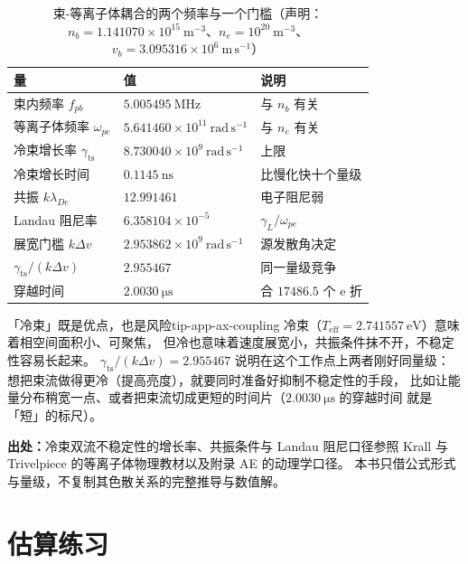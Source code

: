 \begin{table}[htbp]
\centering
\small
\caption{束-等离子体耦合的两个频率与一个门槛（声明：$n_b=1.141070\times10^{15}\ \mathrm{m^{-3}}$、$n_e=10^{20}\ \mathrm{m^{-3}}$、$v_b=3.095316\times10^{6}\ \mathrm{m\,s^{-1}}$）}
\label{tab:app-ax-coupling}
\begin{tabular}{p{5.0cm}p{4.4cm}p{4.0cm}}
\hline
量 & 值 & 说明 \\
\hline
束内频率 $f_{pb}$ & $5.005495\ \mathrm{MHz}$ & 与 $n_b$ 有关 \\
等离子体频率 $\omega_{pe}$ & $5.641460\times10^{11}\ \mathrm{rad\,s^{-1}}$ & 与 $n_e$ 有关 \\
冷束增长率 $\gamma_\mathrm{ts}$ & $8.730040\times10^{9}\ \mathrm{rad\,s^{-1}}$ & 上限 \\
冷束增长时间 & $0.1145\ \mathrm{ns}$ & 比慢化快十个量级 \\
共振 $k\lambda_{De}$ & $12.991461$ & 电子阻尼弱 \\
Landau 阻尼率 & $6.358104\times10^{-5}$ & $\gamma_L/\omega_{pe}$ \\
展宽门槛 $k\Delta v$ & $2.953862\times10^{9}\ \mathrm{rad\,s^{-1}}$ & 源发散角决定 \\
$\gamma_\mathrm{ts}/(k\Delta v)$ & $2.955467$ & 同一量级竞争 \\
穿越时间 & $2.0030\ \mathrm{\mu s}$ & 合 $17486.5$ 个 e 折 \\
\hline
\end{tabular}
\end{table}

\begin{tip}{「冷束」既是优点，也是风险}{tip-app-ax-coupling}
冷束（$T_\mathrm{eff}=2.741557\ \mathrm{eV}$）意味着相空间面积小、可聚焦，
但冷也意味着速度展宽小，共振条件抹不开，不稳定性容易长起来。
$\gamma_\mathrm{ts}/(k\Delta v)=2.955467$ 说明在这个工作点上两者刚好同量级：
想把束流做得更冷（提高亮度），就要同时准备好抑制不稳定性的手段，
比如让能量分布稍宽一点、或者把束流切成更短的时间片（$2.0030\ \mathrm{\mu s}$ 的穿越时间
就是「短」的标尺）。
\end{tip}

{\footnotesize
\textbf{出处：}冷束双流不稳定性的增长率、共振条件与 Landau 阻尼口径参照
Krall 与 Trivelpiece 的等离子体物理教材以及附录 AE 的动理学口径。
本书只借公式形式与量级，不复制其色散关系的完整推导与数值解。
}

\section{估算练习}
\label{sec:app-ax-problems}

